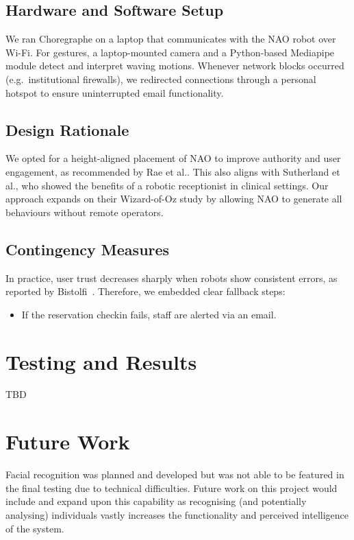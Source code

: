 \documentclass[conference]{IEEEtran}
\begin{document}
\subsection{Hardware and Software Setup} We ran Choregraphe on a laptop that communicates with the NAO robot over Wi-Fi.
For gestures, a laptop-mounted camera and a Python-based Mediapipe module detect and interpret waving motions.
Whenever network blocks occurred (e.g.\ institutional firewalls), we redirected connections through a personal hotspot to ensure uninterrupted email functionality.

\subsection{Design Rationale} We opted for a height-aligned placement of NAO to improve authority and user engagement,
as recommended by Rae et al.\cite{Rae2013}. This also aligns with Sutherland et al.\cite{Sutherland2019}, who showed the benefits of
a robotic receptionist in clinical settings. Our approach expands on their Wizard-of-Oz study by allowing NAO to generate all behaviours without remote operators.

\subsection{Contingency Measures} In practice, user trust decreases sharply when robots show consistent errors, as reported by Bistolfi~\cite{Bistolfi2022}.
Therefore, we embedded clear fallback steps:
\begin{itemize}
        \item If the reservation checkin fails, staff are alerted via an email.
\end{itemize}


\section{Testing and Results}

TBD

\section{Future Work}Facial recognition was planned and developed but was not able to be featured in the final testing due to 
technical difficulties. Future work on this project would include and expand upon this capability as recognising (and potentially 
analysing) individuals vastly increases the functionality and perceived intelligence of the system.
\end{document}
